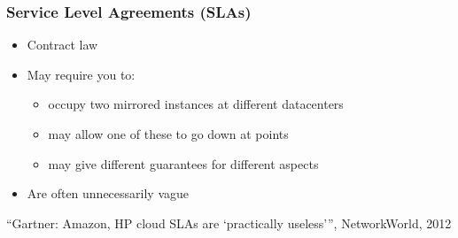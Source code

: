 \documentclass{beamer}
\begin{document}
\begin{frame}
\end{frame}

\begin{frame}
    \frametitle{Service Level Agreements (SLAs)}
    \begin{itemize}
    \item Contract law
    \item May require you to:
      \begin{itemize} %
        \item occupy two mirrored instances at different datacenters
        \item may allow one of these to go down at points
        \item may give different guarantees for different aspects
      \end{itemize}
    \item Are often unnecessarily vague
    \end{itemize}
    \footnotesize{``Gartner: Amazon, HP cloud SLAs are `practically useless''', NetworkWorld, 2012}
\end{frame}
\end{document}

